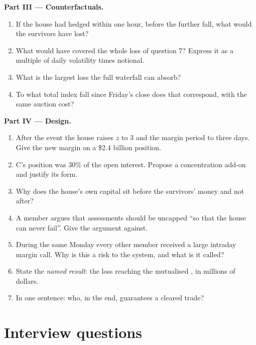 \begin{problem}
\medskip\noindent\textbf{Part III --- Counterfactuals.}
\begin{enumerate}[resume]
\item If the  house had hedged within one hour, before the further
fall, what would the survivors have lost?
\item What  would have covered the whole loss of question 7?
Express it as a multiple of daily volatility times notional.
\item What is the largest loss the full waterfall can absorb?
\item To what total index fall since Friday's close does that correspond,
with the same auction cost?
\end{enumerate}

\medskip\noindent\textbf{Part IV --- Design.}
\begin{enumerate}[resume]
\item After the event the  house raises $z$ to 3 and the margin
period to three days. Give the new margin on a \$2.4 billion position.
\item C's position was 30\% of the open interest. Propose a
concentration add-on and justify its form.
\item Why does the  house's own capital sit before the survivors'
money and not after?
\item A member argues that assessments should be uncapped ``so that the
 house can never fail''. Give the argument against.
\item During the same Monday every other member received a large
intraday margin call. Why is this a risk to the system, and what is it
called?
\item State the \emph{named result}: the loss reaching the mutualised
, in millions of dollars.
\item In one sentence: who, in the end, guarantees a cleared trade?
\end{enumerate}
\end{problem}

\section{Interview questions}

